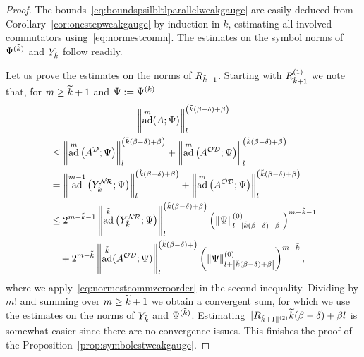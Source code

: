 \documentclass[10pt]{amsart}
\theoremstyle{definition}\newtheorem{defi}[theo]{Definition}\newtheorem{rema}[theo]{Remark}\newtheorem{exam}[theo]{Example}\newtheorem{nota}[theo]{Notation}
\DeclareMathOperator{\ad}{ad}
\newcommand{\CD}{\mathcal{D}}
\newcommand{\CN}{\mathcal{N}}
\newcommand{\CO}{\mathcal{O}}
\newcommand{\CR}{\mathcal{R}}
\newcommand{\COD}{{\CO\CD}}
\newcommand{\CNR}{{\CN\!\CR}}
\newcommand{\snorm}[3]{\left\| #1\right\|_{#3}^{(#2)}}
\let\oldtilde\tilde
\renewcommand*{\tilde}[1]{\mathchoice{\widetilde{#1}}{\widetilde{#1}}{\oldtilde{#1}}{\oldtilde{#1}}}
\begin{document}
\begin{proof}
The bounds~\eqref{eq:boundspsilbltlparallelweakgauge} are easily deduced from Corollary~\ref{cor:onestepweakgauge} by induction in $k$, estimating all involved commutators using~\eqref{eq:normestcomm}. The estimates on the symbol norms of $\Psi^{(\tilde k)}$ and $Y_{\tilde{k}}$ follow readily.

Let us prove the estimates on the norms of $R_{\tilde{k}+1}$. Starting with $R_{\tilde{k}+1}^{(1)}$ we note that, for $m\geq \tilde{k}+1$ and $\Psi:= \Psi^{(\tilde k)}$
\begin{multline}
\left\|\ad^m(A;\Psi)\right\|^{\left(\tilde{k}(\beta-\delta)+\beta\right)}_l\\
\begin{aligned}
&\leq\left\|\ad^m\left(A^\CD;\Psi\right)\right\|^{\left(\tilde{k}(\beta-\delta) +\beta\right)}_l+\left\|\ad^m\left(A^\COD;\Psi\right)\right\|^{\left(\tilde{k}(\beta-\delta)+\beta\right)}_l\\
&=\left\|\ad^{m-1}\left(Y_{\tilde{k}}^{\CNR};\Psi\right)\right\|^{\left(\tilde{k}(\beta-\delta)+\beta\right)}_l +\left\|\ad^m\left(A^\COD;\Psi\right)\right\|^{\left(\tilde{k}(\beta-\delta)+\beta\right)}_l\\
&\leq 2^{m-\tilde{k}-1}\left\|\ad^{\tilde{k}}\left(Y_{\tilde{k}}^{\CNR};\Psi\right)\right\|^{\left(\tilde{k}(\beta-\delta)+\beta\right)}_l\left(\snorm{\Psi}{0}{l+|\tilde{k}(\beta-\delta)+\beta|}\right)^{m-\tilde{k}-1} \\
& \quad +2^{m-\tilde{k}}\left\|\ad^{\tilde{k}}(A^\COD;\Psi)\right\|^{\left(\tilde{k}(\beta-\delta)+\right)}_l \left(\snorm{\Psi}{0}{l+\left|\tilde{k}(\beta-\delta)+\beta\right|}\right)^{m-\tilde{k}},
\end{aligned}
\end{multline}
where we apply~\eqref{eq:normestcommzeroorder} in the second inequality. Dividing by $m!$ and summing over $m\geq \tilde{k}+1$ we obtain a convergent sum, for which we use the estimates on the norms of $Y_{\tilde{k}}$ and $\Psi^{(\tilde k)}$. Estimating $\|R_{\tilde{k}+1\|^{(2)}}{\tilde{k}(\beta-\delta)+\beta}{l}$ is somewhat easier since there are no convergence issues. This finishes the proof of the Proposition~\ref{prop:symbolestweakgauge}.
\end{proof}
\end{document}

